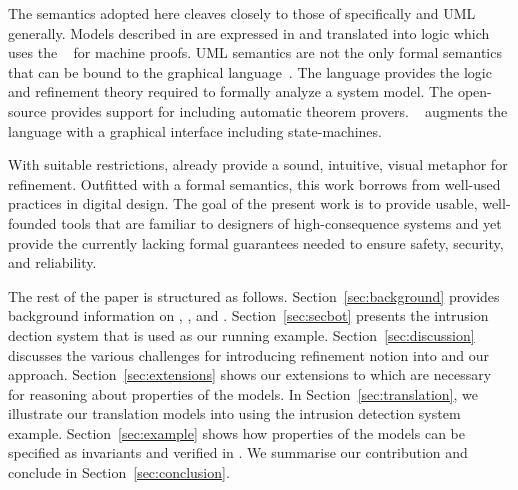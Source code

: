 The semantics adopted here cleaves closely to those of \iUMLB
specifically and UML \Statecharts~\cite{Alexandre} generally.
 Models
described in \Statecharts are expressed in \SCXML and translated into
\EventB logic which uses the \Rodin~\cite{Abrial} for machine
proofs.  UML \Statechart semantics are not the only formal semantics
that can be bound to the \Statechart graphical
language~\cite{Eshuis_2009}.
%
The \EventB language
\cite{abrial10:_model_event_b} provides the logic and refinement
theory required to formally analyze a system model.  The open-source
\Rodin \cite{abrial10:_rodin} provides support for \EventB
including automatic theorem provers.  \iUMLB~\cite{snook14:_b_statem}
augments the \EventB language with a graphical interface including
state-machines.  

With suitable restrictions, \Statecharts already provide a sound,
intuitive, visual metaphor for refinement. Outfitted with a formal
semantics, this work borrows from well-used \Statechart practices in
digital design.  The goal of the present work is to provide usable,
well-founded tools that are familiar to designers of high-consequence
systems and yet provide the currently lacking formal guarantees needed
to ensure safety, security, and reliability.

The rest of the paper is structured as follows.  Section~\ref{sec:background} provides background information on \SCXML, \EventB, and \iUMLB.  Section~\ref{sec:secbot} presents the intrusion dection system that is used as our running example.  Section~\ref{sec:discussion} discusses the various challenges for introducing refinement notion into \SCXML and our approach.  Section~\ref{sec:extensions} shows our extensions to \SCXML which are necessary for reasoning about properties of the \SCXML models.  In Section~\ref{sec:translation}, we illustrate our translation \SCXML models into \EventB using the intrusion detection system example.  Section~\ref{sec:example} shows how properties of the \SCXML models can be specified as invariants and verified in \EventB.  We summarise our contribution and conclude in Section~\ref{sec:conclusion}.

